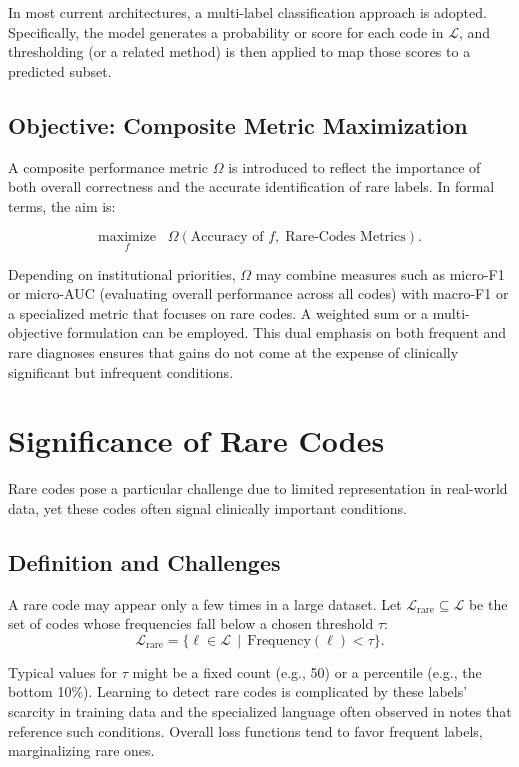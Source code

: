 In most current architectures, a multi-label classification approach is adopted. Specifically, the model generates a probability or score for each code in \(\mathcal{L}\), and thresholding (or a related method) is then applied to map those scores to a predicted subset.

\subsection{Objective: Composite Metric Maximization}
A composite performance metric \(\Omega\) is introduced to reflect the importance of both overall correctness and the accurate identification of rare labels. In formal terms, the aim is:

\begin{equation}
\underset{f}{\text{maximize}}\;\;\; \Omega(\text{Accuracy of } f,\;\text{Rare-Codes Metrics}).
\label{eq:objomega}
\end{equation}

Depending on institutional priorities, \(\Omega\) may combine measures such as micro-F1 or micro-AUC (evaluating overall performance across all codes) with macro-F1 or a specialized metric that focuses on rare codes. A weighted sum or a multi-objective formulation can be employed. This dual emphasis on both frequent and rare diagnoses ensures that gains do not come at the expense of clinically significant but infrequent conditions.

\section{Significance of Rare Codes}
\label{sec:rare_codes}

Rare codes pose a particular challenge due to limited representation in real-world data, yet these codes often signal clinically important conditions.

\subsection{Definition and Challenges}
A rare code may appear only a few times in a large dataset. Let \(\mathcal{L}_{\mathrm{rare}} \subseteq \mathcal{L}\) be the set of codes whose frequencies fall below a chosen threshold \(\tau\):
\[
\mathcal{L}_{\text{rare}} 
= 
\{\ell \in \mathcal{L} \,\mid\, \text{Frequency}(\ell) < \tau\}.
\]

Typical values for \(\tau\) might be a fixed count (e.g., 50) or a percentile (e.g., the bottom 10\%). Learning to detect rare codes is complicated by these labels’ scarcity in training data and the specialized language often observed in notes that reference such conditions. Overall loss functions tend to favor frequent labels, marginalizing rare ones.

